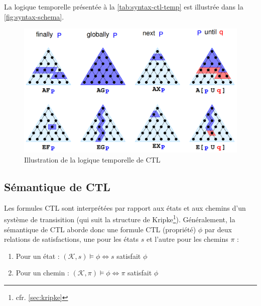 \documentclass[runningheads,a4paper,10pt]{llncs}
\begin{document}
La logique temporelle présentée à la \autoref{tab:syntax-ctl-temp} est illustrée dans la \autoref{fig:syntax-schema}. 

\begin{figure}
  \centering
   \includegraphics[scale=0.43]{figures/syntax-schema.png}
   \caption[Caption for LOF]{Illustration de la logique temporelle de CTL\protect\footnotemark}
   \label{fig:syntax-schema}
\end{figure}





\newpage
\subsection{Sémantique de CTL} \label{sec:sem-CTL}
Les formules CTL sont interprétées par rapport aux états et aux chemins d'un système de transisition (qui suit la structure de Kripke\footnote{cfr. \autoref{sec:kripke}}). Généralement, la sémantique de CTL aborde donc une formule CTL (propriété) $\phi$ par deux relations de satisfactions, une pour les états $s$ et l'autre pour les chemins $\pi$ :

\begin{enumerate}
\item Pour un état :  $(\mathcal{K},s) \vDash \phi \Leftrightarrow s$ satisfait $\phi$ 
\item Pour un chemin : $(\mathcal{K},\pi) \vDash \phi \Leftrightarrow \pi$ satisfait $\phi$ 
\end{enumerate}
\end{document}

